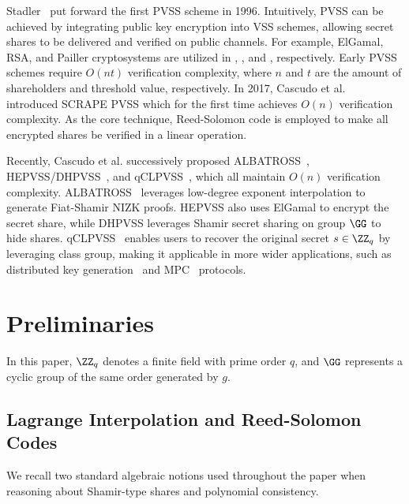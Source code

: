 \documentclass[runningheads]{llncs}
\begin{document}
Stadler~\cite{Stadler1996PVSS} put forward the first PVSS scheme in 1996. Intuitively, PVSS can be achieved by integrating public key encryption into VSS schemes, allowing secret shares to be delivered and verified on public channels. For example, ElGamal, RSA, and Pailler cryptosystems are utilized in \cite{Stadler1996PVSS,Schoenmakers1999PVSS}, \cite{Fujisaki1998PVSS}, and \cite{Ruiz2005PVSS}, respectively.
Early PVSS schemes require $O(nt)$ verification complexity, where $n$ and $t$ are the amount of shareholders and threshold value, respectively.
In 2017, Cascudo et al.~\cite{Cascudo2017PVSS} introduced SCRAPE PVSS which for the first time achieves $O(n)$ verification complexity. As the core technique, Reed-Solomon code is employed to make all encrypted shares be verified in a linear operation.

Recently, Cascudo et al. successively proposed ALBATROSS~\cite{cascudo2020albatross}, HEPVSS/DHPVSS~\cite{cascudo2022yolo}, and qCLPVSS~\cite{cascudo2024publicly}, which all maintain $O(n)$ verification complexity. ALBATROSS~\cite{cascudo2020albatross} leverages low-degree exponent interpolation to generate Fiat-Shamir NIZK proofs.
HEPVSS\cite{cascudo2022yolo} also uses ElGamal to encrypt the secret share, while DHPVSS\cite{cascudo2022yolo} leverages Shamir secret sharing on group $\GG$ to hide shares.
qCLPVSS~\cite{cascudo2024publicly} enables users to recover the original secret $s\in \ZZ_q$ by leveraging class group, making it applicable in more wider applications, such as distributed key generation~\cite{Das2022DKG,cascudo2024publicly} and MPC~\cite{cascudo2024publicly,cascudo2022yolo} protocols.




\section{Preliminaries}
\label{sec:preliminaries}

In this paper, \( \ZZ_q \) denotes a finite field with prime order \( q \), and \( \GG \) represents a cyclic group of the same order generated by \( g \).


\subsection{Lagrange Interpolation and Reed-Solomon Codes}
\label{sec:prelim_lagrange_rs}
We recall two standard algebraic notions used throughout the paper when reasoning about Shamir-type shares and polynomial consistency.
\end{document}
